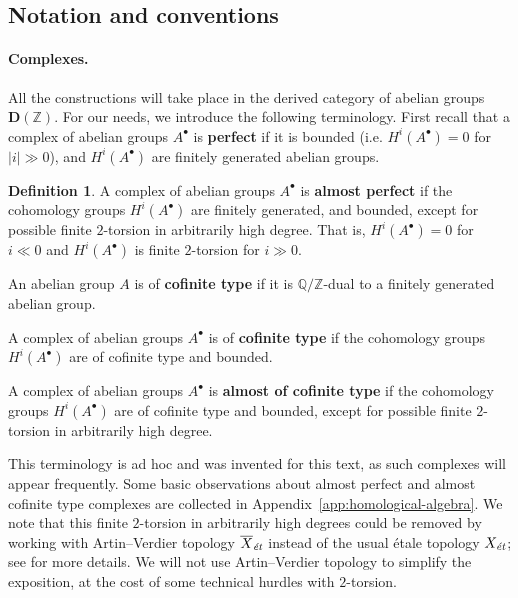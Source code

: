 \documentclass{article}
\newcommand{\QQ}{\mathbb{Q}}
\newcommand{\ZZ}{\mathbb{Z}}
\newcommand{\et}{\text{\it ét}}
\theoremstyle{definition}
\newtheorem{definition}[theorem]{Definition}
\numberwithin{equation}{section}
\begin{document}
\subsection*{Notation and conventions}

\paragraph{Complexes.}
All the constructions will take place in the derived category of abelian groups
$\mathbf{D} (\ZZ)$. For our needs, we introduce the following terminology.
First recall that a complex of abelian groups $A^\bullet$ is \textbf{perfect} if
it is bounded (i.e. $H^i (A^\bullet) = 0$ for $|i| \gg 0$), and $H^i (A^\bullet)$
are finitely generated abelian groups.

\begin{definition}
  \label{dfn:almost-of-(co)finite-type}
  A complex of abelian groups $A^\bullet$ is \textbf{almost perfect}
  if the cohomology groups $H^i (A^\bullet)$ are finitely generated, and
  bounded, except for possible finite $2$-torsion in arbitrarily high degree.
  That is, $H^i (A^\bullet) = 0$ for $i \ll 0$ and $H^i (A^\bullet)$ is finite
  $2$-torsion for $i \gg 0$.

  An abelian group $A$ is of \textbf{cofinite type} if it is $\QQ/\ZZ$-dual to
  a finitely generated abelian group.

  A complex of abelian groups $A^\bullet$ is of \textbf{cofinite type} if the
  cohomology groups $H^i (A^\bullet)$ are of cofinite type and bounded.

  A complex of abelian groups $A^\bullet$ is \textbf{almost of cofinite type}
  if the cohomology groups $H^i (A^\bullet)$ are of cofinite type and
  bounded, except for possible finite $2$-torsion in arbitrarily high
  degree.
\end{definition}

This terminology is ad hoc and was invented for this text, as such complexes
will appear frequently. Some basic observations about almost perfect and almost
cofinite type complexes are collected in
Appendix~\ref{app:homological-algebra}. We note that this finite $2$-torsion
in arbitrarily high degrees could be removed by working with Artin--Verdier
topology $\overline{X}_\et$ instead of the usual étale topology $X_\et$;
see \cite[Appendix~A]{Flach-Morin-2018} for more details. We will not use
Artin--Verdier topology to simplify the exposition, at the cost of some
technical hurdles with $2$-torsion.
\end{document}

